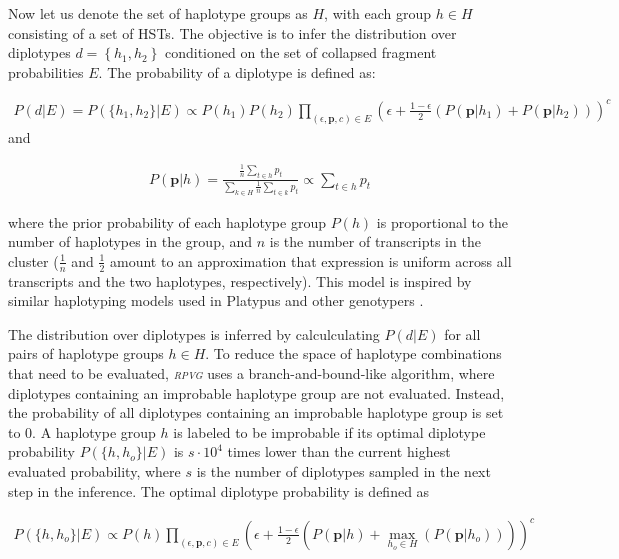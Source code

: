 \documentclass[11pt]{ucthesis}
\newcommand{\tool}[1]{\emph{\textsc{#1}}}
\begin{document}
Now let us denote the set of haplotype groups as $H$, with each group ${h \in H}$ consisting of a set of HSTs. The objective is to infer the distribution over diplotypes ${d=\left\{h_1,h_2\right\}}$ conditioned on the set of collapsed fragment probabilities $E$. The probability of a diplotype is defined as:

\begin{align}
    P(d|E)=P(\{h_1,h_2\}|E)\propto P(h_1)P(h_2)\prod_{\left(\epsilon, \textbf{p}, c\right) \in E}\left(\epsilon+\frac{1-\epsilon}{2}\left(P(\textbf{p}|h_1)+P(\textbf{p}|h_2)\right)\right)^c
\end{align}
\noindent and

\begin{align}
    P(\textbf{p}|h)=\frac{\frac{1}{n}\sum_{t\in h}p_t}{\sum_{k\in H}\frac{1}{n}\sum_{t\in k}p_t}\propto\sum_{t\in h}p_t
\end{align}

\noindent where the prior probability of each haplotype group $P(h)$ is proportional to the number of haplotypes in the group, and $n$ is the number of transcripts in the cluster ($\tfrac{1}{n}$ and $\tfrac{1}{2}$ amount to an approximation that expression is uniform across all transcripts and the two haplotypes, respectively). This model is inspired by similar haplotyping models used in Platypus and other genotypers \cite{rimmer2014integrating,albers2011dindel,poplin2018scaling}. 

The distribution over diplotypes is inferred by calculculating ${P(d|E)}$ for all pairs of haplotype groups ${h\in H}$. To reduce the space of haplotype combinations that need to be evaluated, \tool{rpvg} uses a branch-and-bound-like algorithm, where diplotypes containing an improbable haplotype group are not evaluated. Instead, the probability of all diplotypes containing an improbable haplotype group is set to 0. A haplotype group $h$ is labeled to be improbable if its optimal diplotype probability ${P(\{h,h_o\}|E)}$ is ${s\cdot 10^4}$ times lower than the current highest evaluated probability, where $s$ is the number of diplotypes sampled in the next step in the inference. The optimal diplotype probability is defined as

\begin{align}
    P(\{h,h_o\}|E)\propto P(h)\prod_{\left(\epsilon, \textbf{p}, c\right) \in E}\left(\epsilon+\frac{1-\epsilon}{2}\left(P(\textbf{p}|h)+\max_{h_o \in H}\left(P(\textbf{p}|h_o)\right)\right)\right)^c
\end{align}
\end{document}
